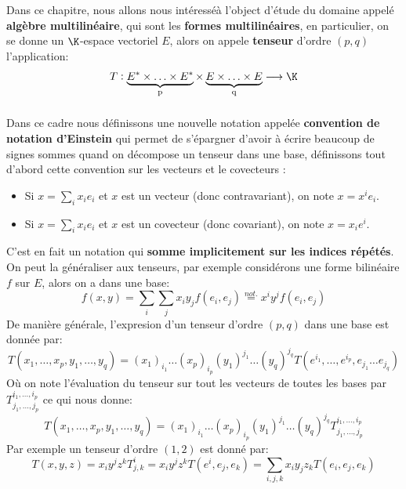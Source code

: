 \documentclass{report}
\begin{document}
   \chapter*{}
   Dans ce chapitre, nous allons nous intéresséà l'object d'étude du domaine appelé \textbf{algèbre multilinéaire}, qui sont les \textbf{formes multilinéaires}, en particulier, on se donne un \(\K\)-espace vectoriel \(E\), alors on appele \textbf{tenseur} d'ordre \((p, q)\) l'application:
   \begin{align*}
      T : \underbrace{E^* \times \ldots \times E^*}_\text{p} \times \underbrace{E \times \ldots \times E}_\text{q} \longrightarrow \K
   \end{align*}

   \subsection*{}
   Dans ce cadre nous définissons une nouvelle notation appelée \textbf{convention de notation d'Einstein} qui permet de s'épargner d'avoir à écrire beaucoup de signes sommes quand on décompose un tenseur dans une base, définissons tout d'abord cette convention sur les vecteurs et le covecteurs :
   \begin{itemize}
      \item Si \(x = \sum_{i} x_ie_i\) et \(x\) est un vecteur (donc contravariant), on note \(x = x^ie_i\).
      \item Si \(x = \sum_{i} x_ie_i\) et \(x\) est un covecteur (donc covariant), on note \(x = x_ie^i\).
   \end{itemize}
   C'est en fait un notation qui \textbf{somme implicitement sur les indices répétés}. On peut la généraliser aux tenseurs, par exemple considérons une forme bilinéaire \(f\) sur \(E\), alors on a dans une base:
   \[
      f(x, y) = \sum_{i}\sum_{j} x_iy_jf(e_i, e_j) \overset{not.}{=} x^iy^jf(e_i, e_j)
   \]
   De manière générale, l'expresion d'un tenseur d'ordre \((p, q)\) dans une base est donnée par:
   \[
      T(x_1, \ldots, x_{p}, y_1, \ldots, y_q) = (x_1)_{i_1}  \ldots (x_p)_{i_p} (y_1)^{j_1} \ldots (y_{q})^{j_q} T(e^{i_1}, \ldots, e^{i_p}, e_{j_1} \ldots e_{j_q})
   \]
   Où on note l'évaluation du tenseur sur tout les vecteurs de toutes les bases par \(T^{{i_1}, \ldots, {i_p}}_{{j_1}, \ldots, {j_p}}\) ce qui nous donne:
   \[
      T(x_1, \ldots, x_{p}, y_1, \ldots, y_q) = (x_1)_{i_1}  \ldots (x_p)_{i_p} (y_1)^{j_1} \ldots (y_{q})^{j_q} T^{{i_1}, \ldots, {i_p}}_{{j_1}, \ldots, {j_p}}
   \]
   Par exemple un tenseur d'ordre \((1, 2)\) est donné par:
   \[
      T(x, y, z) = x_iy^jz^k T_{j, k}^{i} = x_iy^jz^kT(e^i, e_j, e_k) = \sum_{i,j,k}x_iy_jz_kT(e_i, e_j, e_k)
   \]
\end{document}
